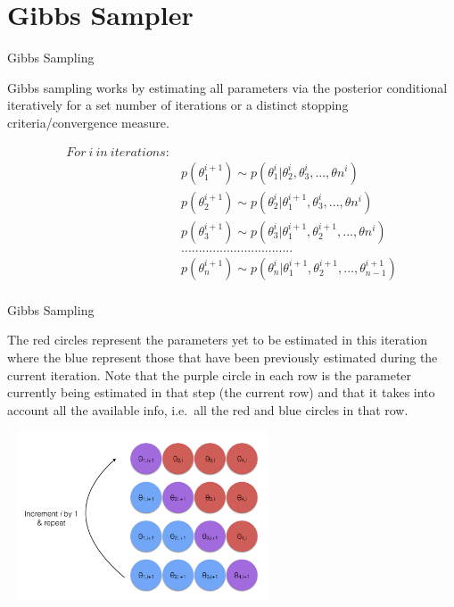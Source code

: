 \documentclass[
  ignorenonframetext,
]{beamer}
\begin{document}
\hypertarget{gibbs-sampler}{%
\section{Gibbs Sampler}\label{gibbs-sampler}}

\begin{frame}{Gibbs Sampling}
\protect\hypertarget{gibbs-sampling}{}

\footnotesize

Gibbs sampling works by estimating all parameters via the posterior
conditional iteratively for a set number of iterations or a distinct
stopping criteria/convergence measure.

\begin{equation}
\begin{aligned}
For \ i \ in \ iterations:\\
&p(\theta_{1}^{i+1}) \sim p(\theta_{1}^{i}|\theta_{2}^{i}, \theta_{3}^{i},..., \theta{n}^{i}) \\
&p(\theta_{2}^{i+1}) \sim p(\theta_{2}^{i}|\theta_{1}^{i+1}, \theta_{3}^{i},..., \theta{n}^{i}) \\
&p(\theta_{3}^{i+1}) \sim p(\theta_{3}^{i}|\theta_{1}^{i+1}, \theta_{2}^{i+1},..., \theta{n}^{i}) \\
&................................ \\ 
&p(\theta_{n}^{i+1}) \sim p(\theta_{n}^{i}|\theta_{1}^{i+1}, \theta_{2}^{i+1},..., \theta_{n-1}^{i+1}) \\
\end{aligned}
\end{equation}

\end{frame}

\begin{frame}{Gibbs Sampling}
\protect\hypertarget{gibbs-sampling-1}{}

\footnotesize

The red circles represent the parameters yet to be estimated in this
iteration where the blue represent those that have been previously
estimated during the current iteration. Note that the purple circle in
each row is the parameter currently being estimated in that step (the
current row) and that it takes into account all the available info,
i.e.~all the red and blue circles in that row.

\begin{center}\includegraphics[width=8cm,height=5cm]{figures/ldaFig2_12_GibbsSamplingViz} \end{center}

\end{frame}
\end{document}
